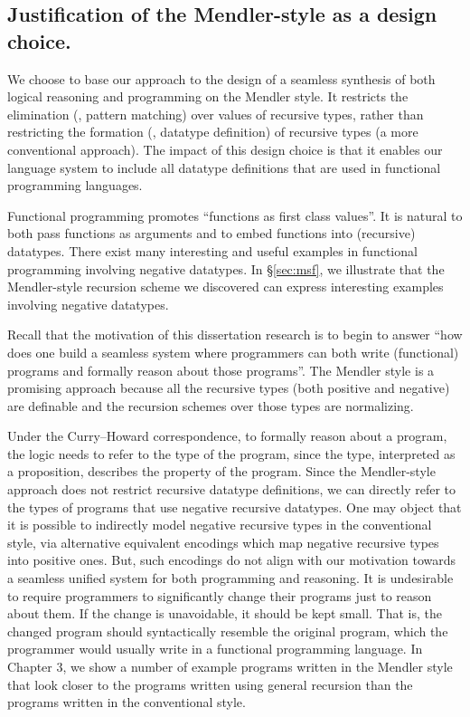 \subsection{Justification of the Mendler-style as a design choice.}
\label{sec:intro:concepts:mendler}
We choose to base our approach to the design of a seamless synthesis of both
logical reasoning and programming on the Mendler style. It restricts
the elimination (\ie, pattern matching) over values of recursive types,
rather than restricting the formation (\ie, datatype definition) of recursive types
(a more conventional approach). The impact of this design choice is that
it enables our language system to include all datatype definitions that
are used in functional programming languages.

Functional programming promotes ``functions as first class values''. It is natural
to both pass functions as arguments and to embed functions into (recursive)
datatypes.  There exist many interesting and useful examples in functional
programming involving negative datatypes. In \S\ref{sec:msf}, we illustrate that
the Mendler-style recursion scheme we discovered can express interesting examples
involving negative datatypes.



Recall that the motivation of this dissertation research is to begin to answer
``how does one build a seamless system where programmers can both
write (functional) programs and formally reason about those programs''.
The Mendler style is a promising approach because
all the recursive types (both positive and negative) are definable and
the recursion schemes over those types are normalizing.

Under the Curry--Howard correspondence, to formally reason about a program,
the logic needs to refer to the type of the program, since the type,
interpreted as a proposition, describes the property of the program.
Since the Mendler-style approach does not restrict recursive datatype
definitions, we can directly refer to the types of programs that use
negative recursive datatypes.
One may object that it is possible to
indirectly model negative recursive types in the conventional style,
via alternative equivalent encodings which map negative recursive types
into positive ones. But, such encodings do not align with our motivation
towards a seamless unified system for both programming and reasoning.
It is undesirable to require programmers to significantly change their
programs just to reason about them. If the change is unavoidable, it should
be kept small. That is, the changed program should syntactically resemble
the original program, which the programmer would usually write in
a functional programming language. In Chapter 3, we show a number of example
programs written in the Mendler style that look closer to the programs written
using general recursion than the programs written in the conventional style.

